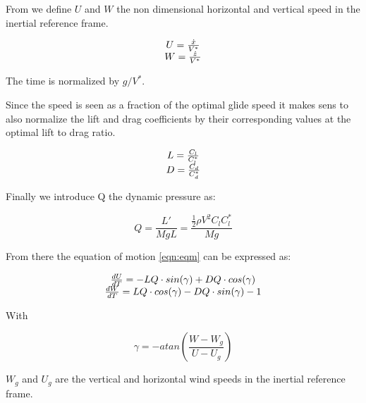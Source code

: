 \par From we define $U$ and $W$ the non dimensional horizontal and vertical speed in the inertial reference frame.

\begin{equation}
\begin{array}[c]{c}
  U = \frac{\dot{x}}{V^*} \\
  W= \frac{\dot{z}}{V^*}
\end{array}
\label{eqn:non_dim_speed}
\end{equation}

The time is normalized by $g / V^*$.

\par Since the speed is seen as a fraction of the optimal glide speed it makes sens to also normalize the lift and drag coefficients by their corresponding values at the optimal lift to drag ratio.

\begin{equation}
\begin{array}[c]{c}
  L= \frac{C_l}{C_l^*} \\
  D= \frac{C_d}{C_d^*} 
\end{array}
\label{eqn:non_dim_coef}
\end{equation}

\par Finally we introduce Q the dynamic pressure as:

\begin{equation}
Q = \frac{L'}{MgL} = \frac{\frac{1}{2} \rho V^2 C_l C_l^* }{Mg}
\label{eqn:dynamic_pressure}
\end{equation}

\par From there the equation of motion \ref{eqn:eqm} can be expressed as:

\begin{equation}
\begin{array}[c]{c}
  \frac{dU}{dT}= -LQ \cdot sin(\gamma) + DQ \cdot cos(\gamma) \\ 
  \frac{dW}{dT}= LQ \cdot cos(\gamma) - DQ \cdot sin(\gamma) - 1
\end{array}
\label{eqn:non_dim_eqm}
\end{equation}

With 

\begin{equation}
\gamma = -atan(\frac{W-W_g}{U-U_g})
\label{eqn:gamma_def}
\end{equation}

$W_g$ and $U_g$ are the vertical and horizontal wind speeds in the inertial reference frame.

